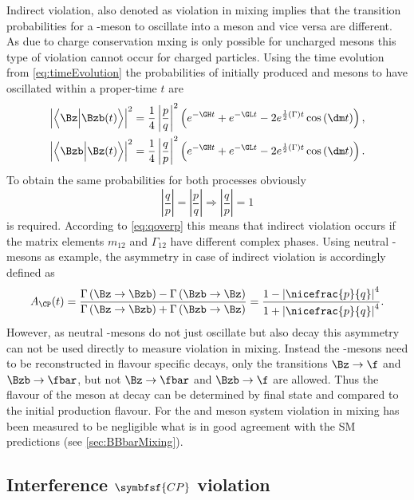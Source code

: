 Indirect \CP violation, also denoted as \CP violation in mixing implies that the transition probabilities for a \Bz-meson to oscillate into a \Bzb meson and vice versa are different.
As due to charge conservation mxing is only possible for uncharged mesons this type of \CP violation cannot occur for charged particles.
Using the time evolution from \cref{eq:timeEvolution} the probabilities of \eg initially produced \Bz and \Bzb mesons to have oscillated within a proper-time $t$ are
\begin{align}
\left|\left<\Bz\Big|\Bzb\!\left(t\right)\right>\right|^2=\frac{1}{4}\left|\frac{p}{q}\right|^2
\left(e^{-\GH t}+e^{-\GL t}-2e^{\frac{1}{2}\left(\Gamma\right)t}\cos\left(\dm t\right)\right),\\
\left|\left<\Bzb\Big|\Bz\!\left(t\right)\right>\right|^2=\frac{1}{4}\left|\frac{q}{p}\right|^2
\left(e^{-\GH t}+e^{-\GL t}-2e^{\frac{1}{2}\left(\Gamma\right)t}\cos\left(\dm t\right)\right).
\end{align}
To obtain the same probabilities for both processes obviously
\begin{equation}
\left|\frac{q}{p}\right|=\left|\frac{p}{q}\right| \Rightarrow \left|\frac{q}{p}\right|=1
\end{equation}
is required.
According to \cref{eq:qoverp} this means that indirect \CP violation occurs if the matrix elements $m_{12}$ and $\Gamma_{12}$ have different complex phases.
Using neutral \B-mesons as example, the \CP asymmetry in case of indirect \CP violation is accordingly defined as
\begin{equation}
A_{\CP}(t)=\frac{\Gamma\left(\Bz\to\Bzb\right) - \Gamma\left(\Bzb\to\Bz\right)}{\Gamma\left(\Bz\to\Bzb\right) + \Gamma\left(\Bzb\to\Bz\right)}
= \frac{1-\left|\nicefrac{p}{q}\right|^4}{1+\left|\nicefrac{p}{q}\right|^4}.
\end{equation}
However, as neutral \B-mesons do not just oscillate but also decay this asymmetry can not be used directly to measure \CP violation in mixing.
Instead the \B-mesons need to be reconstructed in flavour specific decays, \ie only the transitions $\Bz\to\f$ and $\Bzb\to\fbar$, but not $\Bz\to\fbar$ and $\Bzb\to\f$ are allowed.
Thus the flavour of the meson at decay can be determined by final state and compared to the initial production flavour.
For the \Bz and \Bs meson system \CP violation in mixing has been measured to be negligible \cite{HFLAV2016} what is in good agreement with the \ac{SM} predictions (see \cref{sec:BBbarMixing}).

\subsection[head={Interference \CP violation},tocentry={Interference \CP violation}]{Interference $\symbfsf{C{}P}$ violation}
\label{sec:InterferenceCPV}

